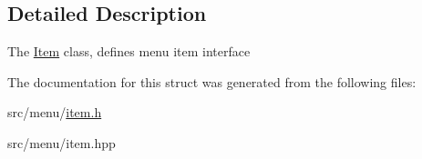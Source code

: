 \subsection{Detailed Description}
The \hyperlink{structItem}{Item} class, defines menu item interface 

The documentation for this struct was generated from the following files\+:\begin{DoxyCompactItemize}
\item 
src/menu/\hyperlink{item_8h}{item.\+h}\item 
src/menu/item.\+hpp\end{DoxyCompactItemize}
